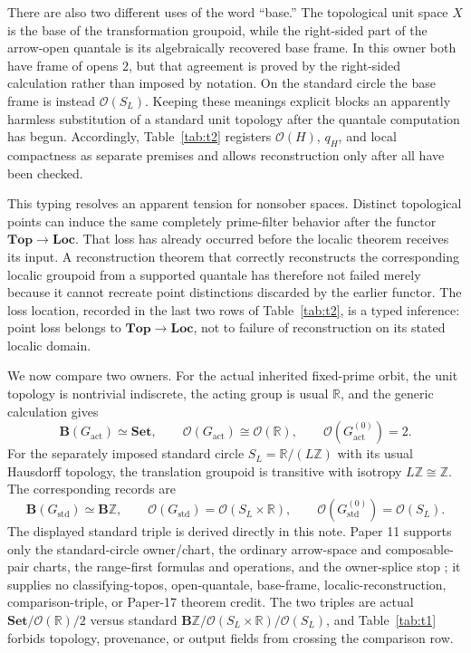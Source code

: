 \documentclass[12pt]{article}
\theoremstyle{definition}
\newcommand{\B}{\mathbf B}
\newcommand{\Ocal}{\mathcal O}
\newcommand{\R}{\mathbb R}
\newcommand{\Z}{\mathbb Z}
\newcommand{\Set}{\mathbf{Set}}
\newcommand{\Loc}{\mathbf{Loc}}
\newcommand{\Top}{\mathbf{Top}}
\begin{document}
There are also two different uses of the word ``base.''  The topological unit space $X$ is the base of the transformation groupoid, while the right-sided part of the arrow-open quantale is its algebraically recovered base frame.  In this owner both have frame of opens $2$, but that agreement is proved by the right-sided calculation rather than imposed by notation.  On the standard circle the base frame is instead $\Ocal(S_L)$.  Keeping these meanings explicit blocks an apparently harmless substitution of a standard unit topology after the quantale computation has begun.
Accordingly, Table~\ref{tab:t2} registers $\Ocal(H)$, $q_H$, and local compactness as separate premises and allows reconstruction only after all have been checked.

This typing resolves an apparent tension for nonsober spaces.  Distinct topological points can induce the same completely prime-filter behavior after the functor $\Top\to\Loc$.  That loss has already occurred before the localic theorem receives its input.  A reconstruction theorem that correctly reconstructs the corresponding localic groupoid from a supported quantale has therefore not failed merely because it cannot recreate point distinctions discarded by the earlier functor.
The loss location, recorded in the last two rows of Table~\ref{tab:t2}, is a typed inference: point loss belongs to $\Top\to\Loc$, not to failure of reconstruction on its stated localic domain.

We now compare two owners.  For the actual inherited fixed-prime orbit, the unit topology is nontrivial indiscrete, the acting group is usual $\R$, and the generic calculation gives
\[
 \B(G_{\mathrm{act}})\simeq\Set,\qquad
 \Ocal(G_{\mathrm{act}})\cong\Ocal(\R),\qquad
 \Ocal(G_{\mathrm{act}}^{(0)})=2.
\]
For the separately imposed standard circle $S_L=\R/(L\Z)$ with its usual Hausdorff topology, the translation groupoid is transitive with isotropy $L\Z\cong\Z$.  The corresponding records are
\[
 \B(G_{\mathrm{std}})\simeq\B\Z,\qquad
 \Ocal(G_{\mathrm{std}})=\Ocal(S_L\times\R),\qquad
 \Ocal(G_{\mathrm{std}}^{(0)})=\Ocal(S_L).
\]
The displayed standard triple is derived directly in this note.  Paper 11 supports only the standard-circle owner/chart, the ordinary arrow-space and composable-pair charts, the range-first formulas and operations, and the owner-splice stop \cite[lines~255--277, 313--324, 337--405, and 1079--1087]{wang2026convolution}; it supplies no classifying-topos, open-quantale, base-frame, localic-reconstruction, comparison-triple, or Paper-17 theorem credit.
The two triples are actual $\Set/\Ocal(\R)/2$ versus standard $\B\Z/\Ocal(S_L\times\R)/\Ocal(S_L)$, and Table~\ref{tab:t1} forbids topology, provenance, or output fields from crossing the comparison row.
\end{document}
